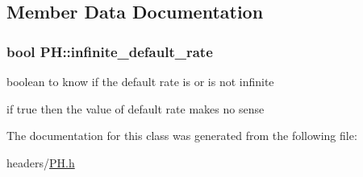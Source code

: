 \subsection{\-Member \-Data \-Documentation}
\hypertarget{class_p_h_aa66efaf095a379c3b108a023d7c98afa}{
\subsubsection[{infinite\-\_\-default\-\_\-rate}]{\setlength{\rightskip}{0pt plus 5cm}bool {\bf \-P\-H\-::infinite\-\_\-default\-\_\-rate}}}\label{class_p_h_aa66efaf095a379c3b108a023d7c98afa}


boolean to know if the default rate is or is not infinite 

if true then the value of default rate makes no sense 

\-The documentation for this class was generated from the following file\-:\begin{DoxyCompactItemize}
\item 
headers/\hyperlink{_p_h_8h}{\-P\-H.\-h}\end{DoxyCompactItemize}
